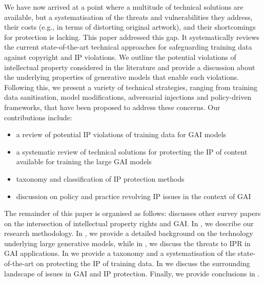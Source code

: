 \documentclass[conference,table]{IEEEtran} %
\begin{document}
We have now arrived at a point where a multitude of technical solutions are available, but a systematisation of the threats and vulnerabilities they address, their costs (e.g., in terms of distorting original artwork), and their shortcomings for protection is lacking.
This paper addressed this gap. It systematically reviews the current state-of-the-art technical approaches for safeguarding training data against copyright and IP violations. 
We outline the potential violations of intellectual property considered in the literature and provide a discussion about the underlying properties of generative models that enable such violations. 
Following this, we present a variety of technical strategies, ranging from training data sanitisation, model modifications, adversarial injections and policy-driven frameworks, that have been proposed to address these concerns.  
Our contributions include:
\begin{itemize}
    \item a review of potential IP violations of training data for GAI models
    \item a systematic review of technical solutions for protecting the IP of content available for training the large GAI models 
    \item taxonomy and classification of IP protection methods
    \item discussion on policy and practice revolving IP issues in the context of GAI
\end{itemize}



The remainder of this paper is organised as follows:  discusses other survey papers on the intersection of intellectual property rights and GAI. In , we describe our research methodology. In , we provide a detailed background on the technology underlying large generative models, while in , we discuss the threats to IPR in GAI applications. In  we provide a taxonomy and a systematisation of the state-of-the-art on protecting the IP of training data. 
In  we discuss the surrounding landscape of issues in GAI and IP protection. Finally, we provide conclusions in .
\end{document}

